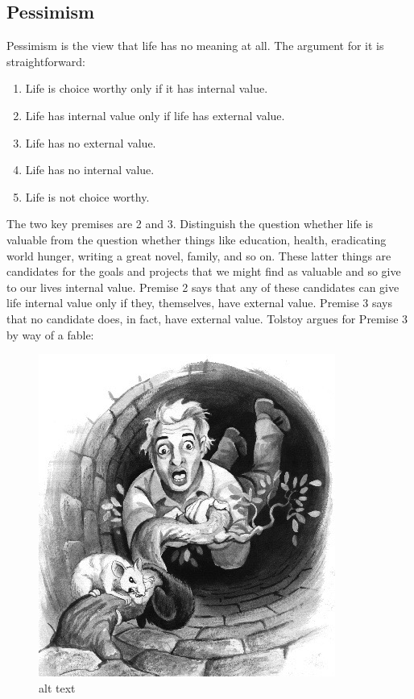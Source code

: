 \documentclass[]{article}
\providecommand{\tightlist}{%
  \setlength{\itemsep}{0pt}\setlength{\parskip}{0pt}}
\begin{document}
\subsection{Pessimism}\label{pessimism}

Pessimism is the view that life has no meaning at all. The argument for
it is straightforward:

\begin{enumerate}
\def\labelenumi{\arabic{enumi}.}
\tightlist
\item
  Life is choice worthy only if it has internal value.
\item
  Life has internal value only if life has external value.
\item
  Life has no external value.
\item
  Life has no internal value.
\item
  Life is not choice worthy.
\end{enumerate}

The two key premises are 2 and 3. Distinguish the question whether life
is valuable from the question whether things like education, health,
eradicating world hunger, writing a great novel, family, and so on.
These latter things are candidates for the goals and projects that we
might find as valuable and so give to our lives internal value. Premise
2 says that any of these candidates can give life internal value only if
they, themselves, have external value. Premise 3 says that no candidate
does, in fact, have external value. Tolstoy argues for Premise 3 by way
of a fable:

\begin{figure}[htbp]
\centering
\includegraphics{Tolstoy.jpg}
\caption{alt text}
\end{figure}
\end{document}
